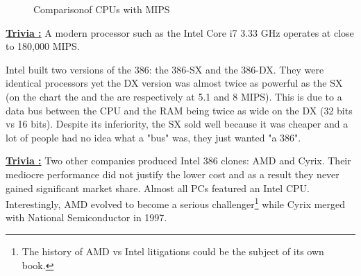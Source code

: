 \documentclass[book.tex]{subfiles}
\begin{document}
\begin{figure}[H]
\centering
   \caption{Comparison\protect\footnotemark of CPUs with MIPS}
 \end{figure}
 \par
 \par
  \textbf{\underline{Trivia :}} A modern processor such as the Intel Core i7 3.33 GHz operates at close to 180,000 MIPS.\\
  \par
 Intel built two versions of the 386: the 386-SX and the 386-DX. They were identical processors yet the DX version was almost twice as powerful as the SX (on the chart the  and the  are respectively at 5.1 and 8 MIPS). This is due to a data bus between the CPU and the RAM being twice as wide on the DX (32 bits vs 16 bits). Despite its inferiority, the SX sold well because it was cheaper and a lot of people had no idea what a "bus" was, they just wanted "a 386".\\



 \par
\textbf{\underline{Trivia :}} Two other companies produced Intel 386 clones: AMD and Cyrix. Their mediocre performance did not justify the lower cost and as a result they never gained significant market share. Almost all PCs featured an Intel CPU. Interestingly, AMD evolved to become a serious challenger\footnote{The history of AMD vs Intel litigations could be the subject of its own book.} while Cyrix merged with National Semiconductor in 1997.\\
\par
\end{document}
